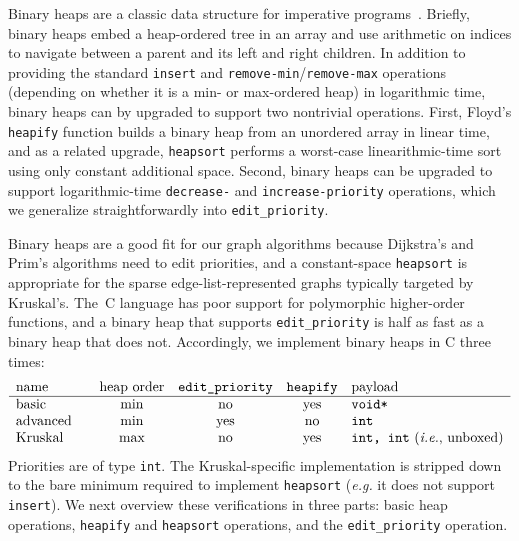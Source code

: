\lstset{style=myTinyStyle}

Binary heaps are a classic data structure for imperative programs~\cite{clrs,sedgewick}.  Briefly, binary heaps embed a heap-ordered tree in an array and use arithmetic on indices to navigate between a parent and its left and right children.  In addition to providing the standard \texttt{insert} and \texttt{remove-min}/\texttt{remove-max} operations (depending on whether it is a min- or max-ordered heap) in logarithmic time, binary heaps can by upgraded to support two nontrivial operations.  First, Floyd's \texttt{heapify} function builds a binary heap from an unordered array in linear time, and as a related upgrade, \texttt{heapsort} performs a worst-case linearithmic-time sort using only constant additional space.  Second, binary heaps can be upgraded to support logarithmic-time \texttt{decrease-} and \texttt{increase-priority} operations, which we generalize straightforwardly into \texttt{edit\_priority}.

Binary heaps are a good fit for our graph algorithms because Dijkstra's and Prim's algorithms need to edit priorities, and a constant-space \texttt{heapsort} is appropriate for the sparse edge-list-represented graphs typically targeted by Kruskal's.  The~C language has poor support for polymorphic higher-order functions, and a binary heap that supports \texttt{edit\_priority} is half as fast as a binary heap that does not.  Accordingly, we implement binary heaps in C three times:
\[
\begin{array}{l@{\qquad}c@{\quad}c@{\quad}c@{\quad}l}
\text{name} & \text{heap order} & \texttt{edit\_priority} & \texttt{heapify} & \text{payload} \\
\hline
\text{basic} & \text{min} & \text{no} & \text{yes} & \texttt{void*} \\
\text{advanced} & \text{min} & \text{yes} & \text{no} & \texttt{int} \\
\text{Kruskal} & \text{max} & \text{no} & \text{yes} & \texttt{int, int} \text{ (\emph{i.e.}, unboxed)}
\end{array}
\]
Priorities are of type \texttt{int}.  %
The Kruskal-specific implementation is stripped down to the bare minimum required to implement \texttt{heapsort} (\emph{e.g.} it does not support \texttt{insert}).  We next overview these verifications in three parts: basic heap operations, \texttt{heapify} and \texttt{heapsort} operations, and the \texttt{edit\_priority} operation.

